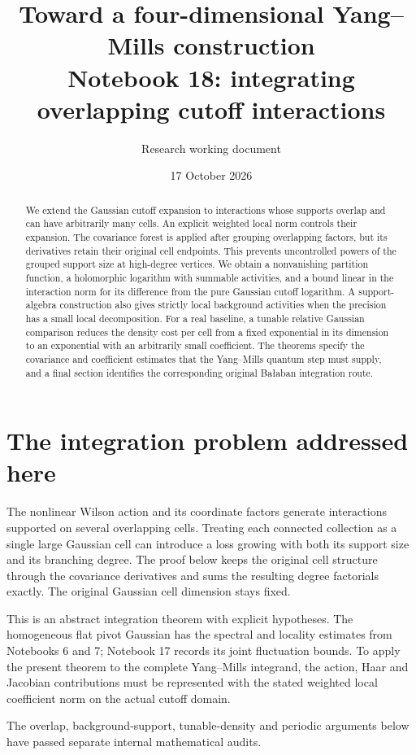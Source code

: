 \documentclass[11pt]{article}
\title{Toward a four-dimensional Yang--Mills construction\\
\large Notebook 18: integrating overlapping cutoff interactions}
\author{Research working document}
\date{17 October 2026}
\theoremstyle{remark}
\begin{document}
\maketitle
\begin{abstract}
We extend the Gaussian cutoff expansion to interactions whose
supports overlap and can have arbitrarily many cells. An explicit
weighted local norm controls their expansion. The covariance forest
is applied after grouping overlapping factors, but its derivatives
retain their original cell endpoints. This prevents uncontrolled
powers of the grouped support size at high-degree vertices. We
obtain a nonvanishing partition function, a holomorphic logarithm
with summable activities, and a bound linear in the interaction norm
for its difference from the pure Gaussian cutoff logarithm.
A support-algebra construction also gives strictly local background
activities when the precision has a small local decomposition.
For a real baseline, a tunable relative Gaussian comparison reduces
the density cost per cell from a fixed exponential in its dimension
to an exponential with an arbitrarily small coefficient. The
theorems specify the covariance and coefficient estimates that
the Yang--Mills quantum step must supply, and a final section
identifies the corresponding original Ba\l aban integration route.
\end{abstract}

\section{The integration problem addressed here}
\label{oc18-target}

The nonlinear Wilson action and its coordinate factors generate
interactions supported on several overlapping cells. Treating each
connected collection as a single large Gaussian cell can introduce
a loss growing with both its support size and its branching degree.
The proof below keeps the original cell structure through the
covariance derivatives and sums the resulting degree factorials
exactly. The original Gaussian cell dimension stays fixed.

This is an abstract integration theorem with explicit hypotheses.
The homogeneous flat pivot Gaussian has the spectral and locality
estimates from Notebooks 6 and 7; Notebook 17 records its joint
fluctuation bounds. To apply the present theorem to the complete
Yang--Mills integrand, the action, Haar and Jacobian contributions
must be represented with the stated weighted local coefficient
norm on the actual cutoff domain.

The overlap, background-support, tunable-density and periodic
arguments below have passed separate internal mathematical audits.
\end{document}
